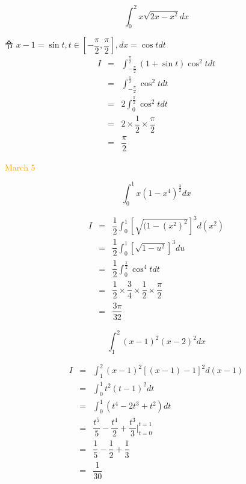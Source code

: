 \begin{example}[][Exam: 29.1.8]
	$$\int_{0}^{2}x\sqrt{2x-x^{2}}dx$$
\end{example}
\begin{solution}
	令 $x - 1 = \sin t, t\in [-\dfrac{\pi}{2}, \dfrac{\pi}{2}], dx = \cos t dt$
	\begin{eqnarray*}
		I & = & \int_{-\frac{\pi}{2}}^{\frac{\pi}{2}}(1+\sin t)\cos^{2} tdt\\
		  & = & \int_{-\frac{\pi}{2}}^{\frac{\pi}{2}}\cos^{2} tdt\\
		  & = & 2\int_{0}^{\frac{\pi}{2}}\cos^{2} tdt\\
		  & = & 2\times \dfrac{1}{2}\times \dfrac{\pi}{2}\\
		  & = & \dfrac{\pi}{2}
	\end{eqnarray*}

\end{solution}

\textcolor{orange}{March 5}

\begin{example}[][Exam: 29.1.9]
	$$\int_{0}^{1}x(1-x^{4})^{\frac{3}{2}}dx$$
\end{example}
\begin{solution}
	\begin{eqnarray*}
		I & = & \dfrac{1}{2}\int_{0}^{1}\left[\sqrt{(1-(x^{2})^{2}}\right]^{3}d(x^{2})\\
		  & = & \dfrac{1}{2}\int_{0}^{1}\left[\sqrt{1-u^{2}}\right]^{3}du\\
		  & = & \dfrac{1}{2}\int_{0}^{\frac{\pi}{2}}\cos^{4}tdt\\
		  & = & \dfrac{1}{2}\times \dfrac{3}{4}\times \dfrac{1}{2}\times \dfrac{\pi}{2}\\
		  & = & \dfrac{3\pi}{32}
	\end{eqnarray*}
\end{solution}
\begin{example}[][Exam: 29.1.10]
	$$\int_{1}^{2}(x-1)^{2}(x-2)^{2}dx$$
\end{example}
\begin{solution}
	\begin{eqnarray*}
		I & = & \int_{1}^{2}(x-1)^{2} \left[(x-1)-1\right]^{2} d(x-1)\\
		  & = & \int_{0}^{1}t^{2}(t-1)^{2}dt\\
		  & = & \int_{0}^{1}(t^{4}-2t^{3}+t^{2})dt\\
		  & = & \dfrac{t^{5}}{5} - \dfrac{t^{4}}{2} + \dfrac{t^{3}}{3}\big|_{t = 0}^{t = 1}\\
		  & = & \dfrac{1}{5} - \dfrac{1}{2} + \dfrac{1}{3}\\
		  & = & \dfrac{1}{30}
	\end{eqnarray*}
\end{solution}

